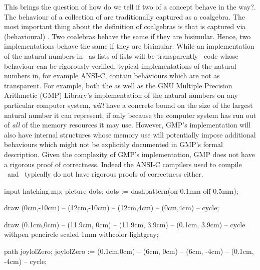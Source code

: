 This brings the question of how do we tell if two  
of a concept behave in the  way?. The behaviour of a 
collection of  are traditionally captured as a coalgebra. 
The most important thing about the definition of coalgebras is that 
 is captured via (behavioural) . Two 
coalebras behave the same if they are bisimular. Hence, two 
implementations behave the same if they are bisimular. While an 
implementation of the natural numbers in \joylolZero\ as lists of lists 
will be transparently \joylolZero\ code whose behaviour can be rigorously 
verified, typical implementations of the natural numbers in, for example 
ANSI-C, contain behaviours which are not as transparent. For example, both 
the \joylolZero as well as the GNU Multiple Precision Arithmetic (GMP) 
Library's implementation of the natural numbers on any particular computer 
system, \emph{will} have a concrete bound on the size of the largest 
natural number it can represent, if only because the computer system has 
run out of \emph{all} of the memory resources it may use. However, GMP's 
implementation will also have internal structures whose memory use will 
potentially impose additional behaviours which might not be explicitly 
documented in GMP's formal description. Given the complexity of GMP's 
implementation, GMP does not have a rigorous proof of correctness. Indeed 
the ANSI-C compilers used to compile \joylolZero\ and \joylol\ typically 
do not have rigorous proofs of correctness either. 



\bgroup\startMPcode
input hatching.mp;
picture dots; dots := dashpattern(on 0.1mm off 0.5mm);

draw (0cm,-10cm) -- (12cm,-10cm) -- (12cm,4cm) -- (0cm,4cm) -- cycle;


draw (0.1cm,0cm) -- (11.9cm, 0cm) -- (11.9cm, 3.9cm) -- (0.1cm, 3.9cm) -- cycle
  withpen pencircle scaled 1mm
  withcolor lightgray;

path joylolZero;
joylolZero := (0.1cm,0cm) -- (6cm, 0cm) --
  (6cm, -4cm) -- (0.1cm, -4cm) -- cycle;

